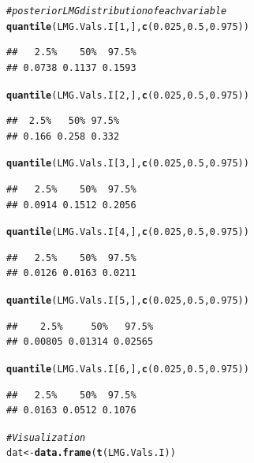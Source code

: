 \documentclass[11pt,a4paper,twoside]{book}\usepackage[]{graphicx}\usepackage[]{color}
\makeatletter
\newcommand{\hlnum}[1]{\textcolor[rgb]{0.686,0.059,0.569}{#1}}%
\newcommand{\hlcom}[1]{\textcolor[rgb]{0.678,0.584,0.686}{\textit{#1}}}%
\newcommand{\hlstd}[1]{\textcolor[rgb]{0.345,0.345,0.345}{#1}}%
\newcommand{\hlkwb}[1]{\textcolor[rgb]{0.69,0.353,0.396}{#1}}%
\newcommand{\hlkwd}[1]{\textcolor[rgb]{0.737,0.353,0.396}{\textbf{#1}}}%
\newenvironment{kframe}{%
 \def\at@end@of@kframe{}%
 \ifinner\ifhmode%
  \def\at@end@of@kframe{\end{minipage}}%
  \begin{minipage}{\columnwidth}%
 \fi\fi%
 \def\FrameCommand##1{\hskip\@totalleftmargin \hskip-\fboxsep
 \colorbox{shadecolor}{##1}\hskip-\fboxsep
     \hskip-\linewidth \hskip-\@totalleftmargin \hskip\columnwidth}%
 \MakeFramed {\advance\hsize-\width
   \@totalleftmargin\z@ \linewidth\hsize
   \@setminipage}}%
 {\par\unskip\endMakeFramed%
 \at@end@of@kframe}
\newenvironment{knitrout}{}{} %
\makeatother
\begin{document}
\begin{knitrout}
\begin{kframe}
\begin{alltt}
\hlcom{# posterior LMG distribution of each variable}
\hlkwd{quantile}\hlstd{(LMG.Vals.I[}\hlnum{1}\hlstd{,],} \hlkwd{c}\hlstd{(}\hlnum{0.025}\hlstd{,} \hlnum{0.5}\hlstd{,} \hlnum{0.975}\hlstd{))}
\end{alltt}
\begin{verbatim}
##   2.5%    50%  97.5% 
## 0.0738 0.1137 0.1593
\end{verbatim}
\begin{alltt}
\hlkwd{quantile}\hlstd{(LMG.Vals.I[}\hlnum{2}\hlstd{,],} \hlkwd{c}\hlstd{(}\hlnum{0.025}\hlstd{,} \hlnum{0.5}\hlstd{,} \hlnum{0.975}\hlstd{))}
\end{alltt}
\begin{verbatim}
##  2.5%   50% 97.5% 
## 0.166 0.258 0.332
\end{verbatim}
\begin{alltt}
\hlkwd{quantile}\hlstd{(LMG.Vals.I[}\hlnum{3}\hlstd{,],} \hlkwd{c}\hlstd{(}\hlnum{0.025}\hlstd{,} \hlnum{0.5}\hlstd{,} \hlnum{0.975}\hlstd{))}
\end{alltt}
\begin{verbatim}
##   2.5%    50%  97.5% 
## 0.0914 0.1512 0.2056
\end{verbatim}
\begin{alltt}
\hlkwd{quantile}\hlstd{(LMG.Vals.I[}\hlnum{4}\hlstd{,],} \hlkwd{c}\hlstd{(}\hlnum{0.025}\hlstd{,} \hlnum{0.5}\hlstd{,} \hlnum{0.975}\hlstd{))}
\end{alltt}
\begin{verbatim}
##   2.5%    50%  97.5% 
## 0.0126 0.0163 0.0211
\end{verbatim}
\begin{alltt}
\hlkwd{quantile}\hlstd{(LMG.Vals.I[}\hlnum{5}\hlstd{,],} \hlkwd{c}\hlstd{(}\hlnum{0.025}\hlstd{,} \hlnum{0.5}\hlstd{,} \hlnum{0.975}\hlstd{))}
\end{alltt}
\begin{verbatim}
##    2.5%     50%   97.5% 
## 0.00805 0.01314 0.02565
\end{verbatim}
\begin{alltt}
\hlkwd{quantile}\hlstd{(LMG.Vals.I[}\hlnum{6}\hlstd{,],} \hlkwd{c}\hlstd{(}\hlnum{0.025}\hlstd{,} \hlnum{0.5}\hlstd{,} \hlnum{0.975}\hlstd{))}
\end{alltt}
\begin{verbatim}
##   2.5%    50%  97.5% 
## 0.0163 0.0512 0.1076
\end{verbatim}
\begin{alltt}
\hlcom{#Visualization}
\hlstd{dat} \hlkwb{<-} \hlkwd{data.frame}\hlstd{(}\hlkwd{t}\hlstd{(LMG.Vals.I))}


\end{alltt}
\end{kframe}
\end{knitrout}
\end{document}
